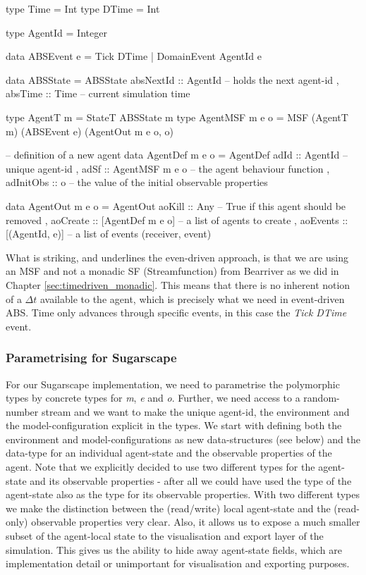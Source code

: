 \begin{HaskellCode}
type Time  = Int
type DTime = Int

type AgentId = Integer

data ABSEvent e = Tick DTime | DomainEvent AgentId e
                
data ABSState = ABSState
  { absNextId :: AgentId -- holds the next agent-id 
  , absTime   :: Time    -- current simulation time
  }

type AgentT m       = StateT ABSState m
type AgentMSF m e o = MSF (AgentT m) (ABSEvent e) (AgentOut m e o, o)

-- definition of a new agent 
data AgentDef m e o = AgentDef
  { adId      :: AgentId         -- unique agent-id
  , adSf      :: AgentMSF m e o  -- the agent behaviour function
  , adInitObs :: o               -- the value of the initial observable properties
  }

data AgentOut m e o = AgentOut 
  { aoKill   :: Any              -- True if this agent should be removed 
  , aoCreate :: [AgentDef m e o] -- a list of agents to create
  , aoEvents :: [(AgentId, e)]   -- a list of events (receiver, event)
  }
\end{HaskellCode}

What is striking, and underlines the even-driven approach, is that we are using an MSF and not a monadic SF (Streamfunction) from Bearriver as we did in Chapter \ref{sec:timedriven_monadic}. This means that there is no inherent notion of a $\Delta t$ available to the agent, which is precisely what we need in event-driven ABS. Time only advances through specific events, in this case the \textit{Tick DTime} event.

\subsubsection{Parametrising for Sugarscape}
For our Sugarscape implementation, we need to parametrise the polymorphic types by concrete types for \textit{m}, \textit{e} and \textit{o}. Further, we need access to a random-number stream and we want to make the unique agent-id, the environment and the model-configuration explicit in the types. We start with defining both the environment and model-configurations as new data-structures (see below) and the data-type for an individual agent-state and the observable properties of the agent. Note that we explicitly decided to use two different types for the agent-state and its observable properties - after all we could have used the type of the agent-state also as the type for its observable properties. With two different types we make the distinction between the (read/write) local agent-state and the (read-only) observable properties very clear. Also, it allows us to expose a much smaller subset of the agent-local state to the visualisation and export layer of the simulation. This gives us the ability to hide away agent-state fields, which are implementation detail or unimportant for visualisation and exporting purposes.

